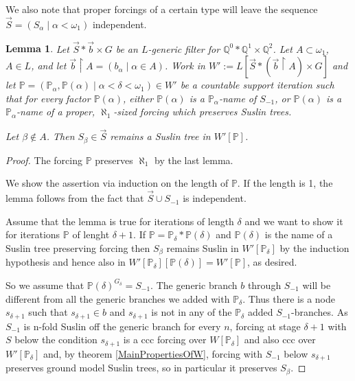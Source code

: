 \documentclass[a4paper,11pt]{article}
\newtheorem{lemma}[theorem]{Lemma}
\newcommand{\forceP}{\mathbb{P}}
\newcommand{\forceQ}{\mathbb{Q}}
\begin{document}
We also note that proper forcings of a certain type will leave the sequence $\vec{S} = (S_{\alpha } \mid \alpha < \omega_1)$ independent.
\begin{lemma}\label{PullingOutATree}
Let $\vec{S} \ast \vec{b} \times G$ be an $L$-generic filter for $\forceQ^0 \ast \forceQ^1 \times \forceQ^2$.
Let $A \subset \omega_1$, $A \in L$, and let $\vec{b} \upharpoonright A = (b_{\alpha} \mid \alpha \in A)$.
Work in $W':=L[\vec{S} \ast (\vec{b} \upharpoonright A) \times G]$ and let $\forceP = (\forceP_{\alpha}, \forceP(\alpha) \mid \alpha < \delta < \omega_1) \in W' $ be 
a countable support iteration such that for every factor $\forceP(\alpha)$, either $\forceP(\alpha)$ is a $\forceP_{\alpha}$-name of $S_{-1}$, or $\forceP(\alpha)$ is a $\forceP_{\alpha}$-name of a proper, $\aleph_1$-sized forcing which preserves Suslin trees.

Let $\beta \notin A$. Then $S_{\beta} \in \vec{S}$ remains a Suslin tree in $W' [\forceP]$.
\end{lemma}
\begin{proof}
The forcing $\forceP$  preserves $\aleph_1$ by the last lemma.

We show the assertion via induction on the length of $\forceP$. If the length is 1, the lemma follows from the fact that $\vec{S} \cup S_{-1}$ is independent. 

Assume that the lemma is true for iterations of length $\delta$ and we want to show it for iterations $\forceP$ of lenght $\delta+1$. If $\forceP = \forceP_{\delta} \ast \forceP(\delta)$ and $\forceP(\delta)$ is the name of a Suslin tree preserving forcing then $S_{\beta}$ remains Suslin in $W' [\forceP_{\delta}]$ by the induction hypothesis and hence also in $W'[\forceP_{\delta} ] [\forceP(\delta)] = W' [\forceP]$, as desired.

So we assume that $ \forceP(\delta)^{G_{\delta}} =S_{-1}$. The generic branch $b$ through $S_{-1}$ will be different from all the generic branches we added with $\forceP_{\delta}$. Thus there is a node $s_{\delta+1}$ such that $s_{\delta+1} \in b$ and $s_{\delta+1}$ is not in any of the $\forceP_{\delta}$ added $S_{-1}$-branches. As $S_{-1}$ is n-fold Suslin off the generic branch for every $n$, forcing at stage $\delta+1$ with $S$ below the condition $s_{\delta+1}$ is a ccc forcing over $W[\forceP_{\delta}]$ and also ccc over $W' [\forceP_{\delta}]$ and, by theorem \ref{MainPropertiesOfW}, forcing with $S_{-1}$ below $s_{\delta+1}$  preserves ground model Suslin trees, so in particular it preserves $S_{\beta}$.



\end{proof}
\end{document}
